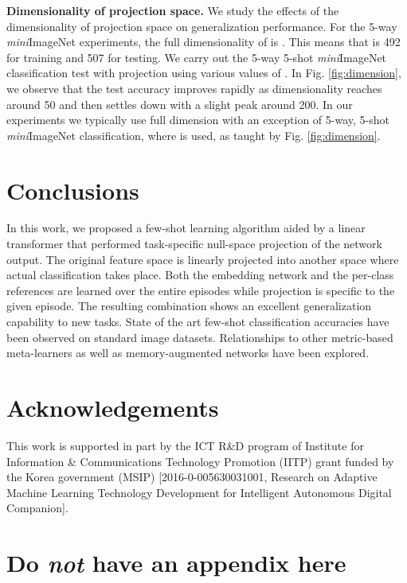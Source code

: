 \documentclass{article}
\begin{document}
\textbf{Dimensionality of projection space.}
We study the effects of the dimensionality of projection space  on generalization performance. 
For the 5-way \textit{mini}ImageNet experiments, the full dimensionality  of  is . This means that   is 492 for training and 507 for testing.
We carry out the 5-way 5-shot \textit{mini}ImageNet classification test with projection using various values of .  
In Fig. \ref{fig:dimension}, we  observe that the test accuracy improves rapidly as dimensionality reaches around 50 and then settles down with a slight peak around 200. In our experiments we typically use full dimension with an exception of 
5-way, 5-shot \textit{mini}ImageNet classification, where  is used, as taught by Fig. \ref{fig:dimension}. 

\section{Conclusions}
In this work, we proposed a few-shot learning algorithm aided by a linear transformer that 
performed task-specific null-space projection of the network output.
The original feature space is linearly
projected into another space where actual classification takes place.
Both the embedding network and the per-class references are learned over the entire episodes while 
projection is specific to the given episode. The resulting combination shows an excellent generalization capability to new tasks. 
State of the art few-shot classification accuracies have been observed on standard image datasets. Relationships to other metric-based meta-learners 
as well as memory-augmented networks have been explored. 



\nocite{langley00}

\section*{Acknowledgements}
This work is supported in part by the ICT R\&D program of Institute for Information \& Communications Technology Promotion (IITP) grant funded by the Korea government (MSIP) [2016-0-005630031001, Research on Adaptive Machine Learning Technology Development for Intelligent Autonomous Digital Companion].










\iffalse
\appendix
\section{Do \emph{not} have an appendix here}
\end{document}
